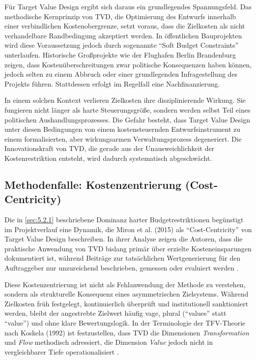 Für Target Value Design ergibt sich daraus ein grundlegendes Spannungsfeld. Das methodische Kernprinzip von \acs{TVD}, die Optimierung des Entwurfs innerhalb einer verbindlichen Kostenobergrenze, setzt voraus, dass die Zielkosten als nicht verhandelbare Randbedingung akzeptiert werden.
 In öffentlichen Bauprojekten wird diese Voraussetzung jedoch durch sogenannte \enquote{Soft Budget Constraints} unterlaufen.\autocite[Vgl.][S.~3 f]{kornai_soft_1986} Historische Großprojekte wie der Flughafen Berlin Brandenburg zeigen, dass Kostenüberschreitungen zwar politische Konsequenzen haben können, jedoch selten zu einem Abbruch oder einer grundlegenden Infragestellung des Projekts führen. Stattdessen erfolgt im Regelfall eine Nachfinanzierung.\autocite[Vgl.][online]{pawlik_flughafen_2022}

In einem solchen Kontext verlieren Zielkosten ihre disziplinierende Wirkung. Sie fungieren nicht länger als harte Steuerungsgröße, sondern werden selbst Teil eines politischen Aushandlungsprozesses. Die Gefahr besteht, dass Target Value Design unter diesen Bedingungen von einem kostensteuernden Entwurfsinstrument zu einem formalisierten, aber wirkungsarmen Verwaltungsprozess degeneriert. Die Innovationskraft von \acs{TVD}, die gerade aus der Unausweichlichkeit der Kostenrestriktion entsteht, wird dadurch systematisch abgeschwächt.

\subsection{Methodenfalle: Kostenzentrierung (Cost-Centricity)}
\label{sec:5.2.2}

Die in \cref{sec:5.2.1} beschriebene Dominanz harter Budgetrestriktionen begünstigt im Projektverlauf eine Dynamik, die Miron et al. (2015) als \enquote{Cost-Centricity} von Target Value Design beschreiben. In ihrer Analyse zeigen die Autoren, dass die praktische Anwendung von \acs{TVD} bislang primär über erzielte Kosteneinsparungen dokumentiert ist, während Beiträge zur tatsächlichen Wertgenerierung für den Auftraggeber nur unzureichend beschrieben, gemessen oder evaluiert werden \autocite[Vgl.][S.~816]{miron_target_2015}.

Diese Kostenzentrierung ist nicht als Fehlanwendung der Methode zu verstehen, sondern als strukturelle Konsequenz eines asymmetrischen Zielsystems. Während Zielkosten früh festgelegt, kontinuierlich überprüft und institutionell sanktioniert werden, bleibt der angestrebte Zielwert häufig vage, plural (\enquote{values} statt \enquote{value}) und ohne klare Bewertungslogik. In der Terminologie der TFV-Theorie nach Koskela (1992) ist festzustellen, dass \acs{TVD} die Dimensionen \textit{Transformation} und \textit{Flow} methodisch adressiert, die Dimension \textit{Value} jedoch nicht in vergleichbarer Tiefe operationalisiert \autocite[Vgl.][S.~51]{koskela_application_1992}.

